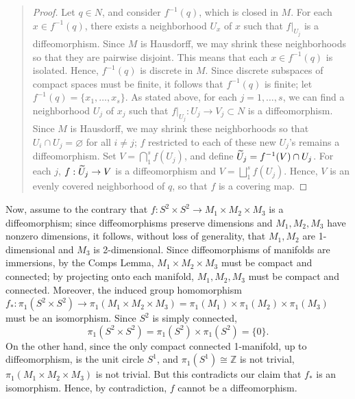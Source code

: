 \documentclass{article}
\begin{document}
\begin{solutions}
\begin{quote}
\begin{proof}
				Let $q \in N$, and consider $f^{-1}(q)$, which is closed in $M$. For each $x \in f^{-1}(q)$, there exists a neighborhood $U_{x}$ of $x$ such that $f|_{U_{j}}$ is a diffeomorphism.  Since $M$ is Hausdorff, we may shrink these neighborhoods so that they are pairwise disjoint. This means that each $x \in f^{-1}(q)$ is isolated. Hence, $f^{-1}(q)$ is discrete in $M$. Since discrete subspaces of compact spaces must be finite, it follows that $f^{-1}(q)$ is finite; let $f^{-1}(q) = \{x_{1}, \ldots, x_{s}\}$. As stated above, for each $j = 1, \ldots, s$, we can find a neighborhood $U_{j}$ of $x_{j}$ such that $f|_{U_{j}}: U_{j} \to V_{j} \subset N$ is a diffeomorphism. Since $M$ is Hausdorff, we may shrink these neighborhoods so that $U_{i} \cap U_{j} = \varnothing$ for all $i \neq j$; $f$ restricted to each of these new $U_{j}$'s remains a diffeomorphism. Set $V = \bigcap_{1}^{s}f(U_{j})$, and define $\widetilde{U}_{j} = f^{-1}(V) \cap  U_{j}$. For each $j$, $f: \widetilde{U}_{j} \to V$ is a diffeomorphism and $V =  \bigsqcup_{1}^{s}f(U_{j})$. Hence, $V$ is an evenly covered neighborhood of $q$, so that $f$ is a covering map.  
			\end{proof}
		\end{quote} 
	Now, assume to the contrary that $f: S^{2} \times S^{2} \to M_{1} \times M_{2} \times M_{3}$ is a diffeomorphism; since diffeomorphisms preserve dimensions and $M_{1}, M_{2}, M_{3}$ have nonzero dimensions, it follows, without loss of generality,  that $M_{1}, M_{2}$ are 1-dimensional and $M_{3}$ is 2-dimensional. Since diffeomorphisms of manifolds are immersions, by the Comps Lemma, $M_{1} \times M_{2} \times M_{3}$ must be compact and connected; by projecting onto each manifold, $M_{1}, M_{2}, M_{3}$ must be compact and connected. Moreover, the induced group homomorphism $f_{\ast}: \pi_{1}(S^{2} \times S^{2}) \to \pi_{1}(M_{1} \times M_{2} \times M_{3}) = \pi_{1}(M_{1}) \times \pi_{1}(M_{2}) \times \pi_{1}(M_{3})$ must be an isomorphism. Since $S^{2}$ is simply connected, 
		\begin{equation}
			\pi_{1}(S^{2} \times S^{2}) = \pi_{1}(S^{2}) \times \pi_{1}(S^{2}) = \{0\}. 
		\end{equation}
	On the other hand, since the only compact connected 1-manifold, up to diffeomorphism, is the unit circle $S^{1}$, and $\pi_{1}(S^{1}) \cong \mathbb{Z}$ is not trivial, $\pi_{1}(M_{1} \times M_{2} \times M_{3})$ is not trivial. But this contradicts our claim that $f_{\ast}$ is an isomorphism. Hence, by contradiction, $f$ cannot be a diffeomorphism. 
\end{solutions}
\end{document}
